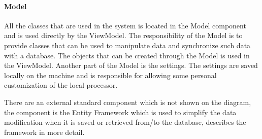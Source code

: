 \paragraph{Model}
All the classes that are used in the system is located in the Model component and is used directly by the ViewModel. The responsibility of the Model is to provide classes that can be used to manipulate data and synchronize such data with a database. The objects that can be created through the Model is used in the ViewModel. Another part of the Model is the settings. The settings are saved locally on the machine and is responsible for allowing some personal customization of the local processor.

There are an external standard component which is not shown on the diagram, the component is the Entity Framework which is used to simplify the data modification when it is saved or retrieved from/to the database,  describes the framework in more detail.
